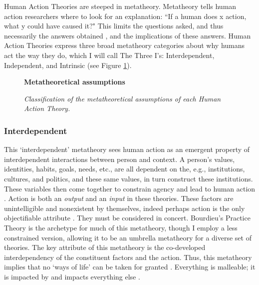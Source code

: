 \documentclass[12 pt]{article}
\begin{document}
	Human Action Theories are steeped in metatheory. Metatheory tells human action researchers where to look for an explanation: ``If a human does x action, what y could have caused it?" This limits the questions asked, and thus necessarily the answers obtained \parencite{Abrams2015}, and the implications of these answers. Human Action Theories express three broad metatheory categories about why humans act the way they do, which I will call The Three I's: Interdependent, Independent, and Intrinsic (see Figure \ref{fig:meta}). 
\begin{figure}
	\centering
	\textbf{Metatheoretical assumptions} \par \medskip
	\caption{\textit{Classification of the metatheoretical assumptions of each Human Action Theory.}}
	 \label{fig:meta}
\end{figure}	  
	\subsubsection{Interdependent} 
		This `interdependent' metatheory sees human action as an emergent property of interdependent interactions between person and context.  A person's values, identities, habits, goals, needs, etc., are all dependent on the, e.g., institutions, cultures, and politics, and these same values, in turn construct these institutions. These variables then come together to constrain agency \parencite{Vigotsky1978} and lead to human action \parencite{Holland1998}. Action is both an \textit{output} and an \textit{input} in these theories.  These factors are unintelligible and nonexistent by themselves, indeed perhaps action is the only objectifiable attribute \parencite{Lewin1939,Bourdieu1977,Heft2012}. They must be considered in concert. Bourdieu's Practice Theory is the archetype for much of this metatheory, though I employ a less constrained version, allowing it to be an umbrella metatheory for a diverse set of theories. The key attribute of this metatheory is the co-developed interdependency of the constituent factors and the action. Thus, this metatheory implies that no `ways of life' can be taken for granted \parencite{Redclift1996}. Everything is malleable; it is impacted by and impacts everything else \parencite{Shove2010}.
		
\end{document}
